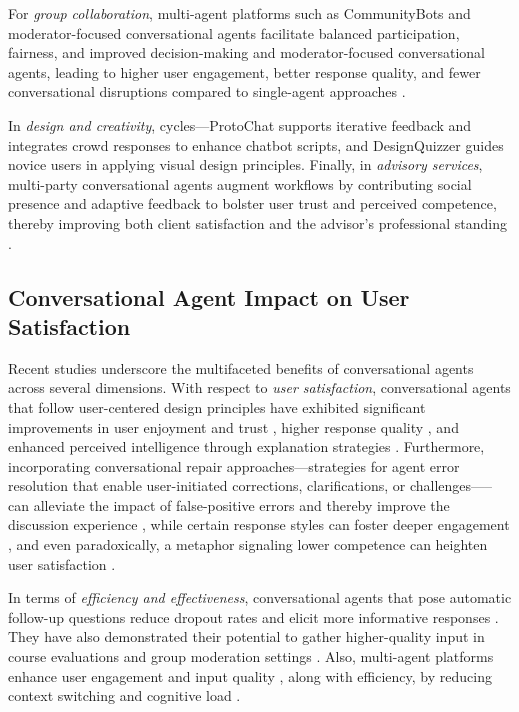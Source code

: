 \documentclass{article}
\begin{document}
For \textit{group collaboration}, multi-agent platforms such as CommunityBots \cite{Jiang2023} and moderator-focused conversational agents facilitate balanced participation, fairness, and improved decision-making \cite{Do2022} and moderator-focused conversational agents\cite{ bagmar2022}, leading to higher user engagement\cite{kim2021}, better response quality\cite{Do2023}, and fewer conversational disruptions compared to single-agent approaches \citep{Jiang2023}. 

In \textit{design and creativity}, cycles—ProtoChat \cite{choi2021} supports iterative feedback and integrates crowd responses to enhance chatbot scripts, and DesignQuizzer \cite{peng2024} guides novice users in applying visual design principles. Finally, in \textit{advisory services}, multi-party conversational agents augment workflows by contributing social presence and adaptive feedback to bolster user trust and perceived competence, thereby improving both client satisfaction and the advisor's professional standing \citep{bucher2024, schmid2022}.

\subsection{Conversational Agent Impact on User Satisfaction}
Recent studies underscore the multifaceted benefits of conversational agents across several dimensions. With respect to \textit{user satisfaction}, conversational agents that follow user-centered design principles have exhibited significant improvements in user enjoyment and trust \citep{schmitt2022}, higher response quality \citep{wambsganss2022}, and enhanced perceived intelligence through explanation strategies \citep{Do2023}. Furthermore, incorporating conversational repair approaches---strategies for agent error resolution that enable user-initiated corrections, clarifications, or challenges—--can alleviate the impact of false-positive errors and thereby improve the discussion experience \citep{Do2022}, while certain response styles can foster deeper engagement \citep{cho2020}, and even paradoxically, a metaphor signaling lower competence can heighten user satisfaction \citep{khadpe2020}. 

In terms of \textit{efficiency and effectiveness}, conversational agents that pose automatic follow-up questions reduce dropout rates and elicit more informative responses \citep{Hu2024}. They have also demonstrated their potential to gather higher-quality input in course evaluations \cite{wambsganss2022} and group moderation settings \cite{bagmar2022}. Also, multi-agent platforms enhance user engagement and input quality \cite{Jiang2023}, along with efficiency, by reducing context switching and cognitive load \cite{Luger2016}. 
\end{document}
